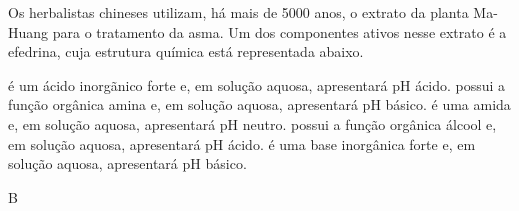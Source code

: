 \documentclass[11pt]{scrartcl}
\begin{document}
\begin{exercise}[points=1.0]
Os herbalistas chineses utilizam, há mais de 5000 anos, o extrato da planta Ma-Huang para o tratamento da asma. Um dos componentes ativos nesse extrato é a efedrina, cuja estrutura química está representada abaixo.

\centerline{
}


\begin{choice}
\choice é um ácido inorgãnico forte e, em solução aquosa, apresentará pH ácido.
\choice possui a função orgânica amina e, em solução aquosa, apresentará pH básico.
\choice é uma amida e, em solução aquosa, apresentará pH neutro.
\choice possui a função orgânica álcool e, em solução aquosa, apresentará pH ácido.
\choice é uma base inorgânica forte e, em solução aquosa, apresentará pH básico.
\end{choice}
\end{exercise}
\begin{solution}
B
\end{solution}
\end{document}
